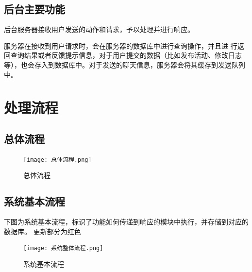 \subsection{后台主要功能}
后台服务器接收用户发送的动作和请求，予以处理并进行响应。

服务器在接收到用户请求时，会在服务器的数据库中进行查询操作，并且进
行返回查询结果或者反馈提示信息，对于用户提交的数据（比如发布活动、修改日志等），也会存入到数据库中。对于发送的聊天信息，服务器会将其缓存到发送队列中。

\section{处理流程}
    \subsection{总体流程}
        \begin{figure}[ht]
            \centering
            \texttt{[image: 总体流程.png]}\label{tab:classification}
            \caption{总体流程}\label{fig:noted-figure}
        \end{figure}
        \newpage
    \subsection{\color{red} 系统基本流程}
        下图为系统基本流程，标识了功能如何传递到响应的模块中执行，并存储到对应的数据库。{\color{red} 更新部分为红色}
        \begin{figure}[ht]
            \centering
            \texttt{[image: 系统整体流程.png]}\label{tab:classification}
            \caption{\color{red} 系统基本流程}\label{fig:noted-figure}
        \end{figure}
        \newpage
